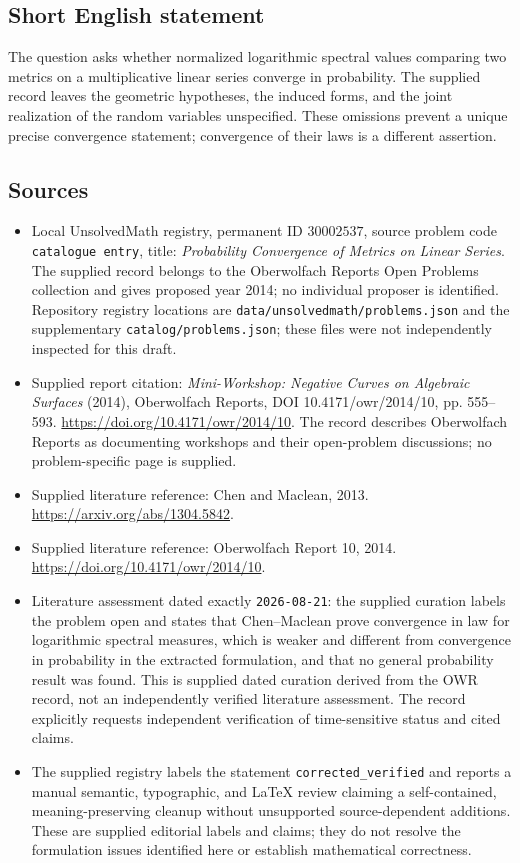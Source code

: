 \documentclass[11pt]{article}
\begin{document}
\subsection{Short English statement}
The question asks whether normalized logarithmic spectral values comparing two metrics on a multiplicative linear series converge in probability. The supplied record leaves the geometric hypotheses, the induced forms, and the joint realization of the random variables unspecified. These omissions prevent a unique precise convergence statement; convergence of their laws is a different assertion.
\subsection{Sources}
\begin{itemize}
\item Local UnsolvedMath registry, permanent ID \(30002537\), source problem code \texttt{catalogue entry}, title: \emph{Probability Convergence of Metrics on Linear Series}. The supplied record belongs to the Oberwolfach Reports Open Problems collection and gives proposed year 2014; no individual proposer is identified. Repository registry locations are \texttt{data/unsolvedmath/problems.json} and the supplementary \texttt{catalog/problems.json}; these files were not independently inspected for this draft.
\item Supplied report citation: \emph{Mini-Workshop: Negative Curves on Algebraic Surfaces} (2014), Oberwolfach Reports, DOI 10.4171/owr/2014/10, pp. 555--593. \url{https://doi.org/10.4171/owr/2014/10}. The record describes Oberwolfach Reports as documenting workshops and their open-problem discussions; no problem-specific page is supplied.
\item Supplied literature reference: Chen and Maclean, 2013. \url{https://arxiv.org/abs/1304.5842}.
\item Supplied literature reference: Oberwolfach Report 10, 2014. \url{https://doi.org/10.4171/owr/2014/10}.
\item Literature assessment dated exactly \texttt{2026-08-21}: the supplied curation labels the problem open and states that Chen--Maclean prove convergence in law for logarithmic spectral measures, which is weaker and different from convergence in probability in the extracted formulation, and that no general probability result was found. This is supplied dated curation derived from the OWR record, not an independently verified literature assessment. The record explicitly requests independent verification of time-sensitive status and cited claims.
\item The supplied registry labels the statement \texttt{corrected\_verified} and reports a manual semantic, typographic, and LaTeX review claiming a self-contained, meaning-preserving cleanup without unsupported source-dependent additions. These are supplied editorial labels and claims; they do not resolve the formulation issues identified here or establish mathematical correctness.
\end{itemize}
\end{document}
